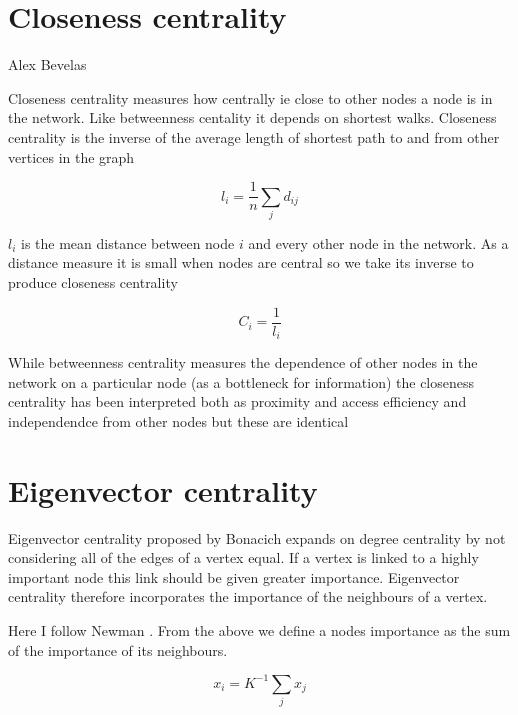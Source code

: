 \section{Closeness centrality}
\label{sec:closenesscentrality}
Alex Bevelas

Closeness centrality measures how centrally ie close to other nodes a node is in the network. Like betweenness centality it depends on shortest walks. Closeness centrality is the inverse of the  average length of shortest path to and from other vertices in the graph \cite{freeman1978centrality}

\begin{equation}
    l_i = \frac{1}{n} \sum_j d_{ij}
\end{equation}

$l_i$ is the mean distance between node $i$ and every other node in the network. As a distance measure it is small when nodes are central so we take its inverse to produce closeness centrality


\begin{equation}
    C_i = \frac{1}{l_i}
\end{equation}

While betweenness centrality measures the dependence of other nodes in the network on a particular node (as a bottleneck for information) the closeness centrality has been interpreted both as proximity and access efficiency and independendce from other nodes  but these are identical



\section{Eigenvector centrality}

Eigenvector centrality proposed by Bonacich \cite{bonacich1972factoring} expands on degree centrality by not considering all of the edges of a vertex equal. If a vertex is linked to a highly important node this link should be given greater importance. Eigenvector centrality therefore incorporates the importance of the neighbours of a vertex.

Here I follow Newman \cite{newman2018networks}. From the above we define a nodes importance as the sum of the importance of its neighbours.

\begin{equation}
    x_i = K^{-1} \sum_j x_j
\end{equation}

